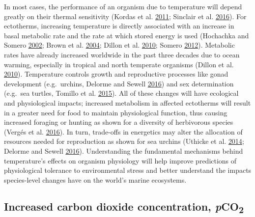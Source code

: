 \documentclass[a4paper,10pt, oneside]{memoir}
\begin{document}
In most cases, the performance of an organism due to temperature will depend greatly on their thermal sensitivity (Kordas et al. \protect\hyperlink{ref-Kordas2011}{2011}; Sinclair et al. \protect\hyperlink{ref-Sinclair2016}{2016}).
For ectotherms, increasing temperature is directly associated with an increase in basal metabolic rate and the rate at which stored energy is used (Hochachka and Somero \protect\hyperlink{ref-Hochachka2002}{2002}; Brown et al. \protect\hyperlink{ref-Brown2004}{2004}; Dillon et al. \protect\hyperlink{ref-Dillon2010}{2010}; Somero \protect\hyperlink{ref-Somero2012}{2012}).
Metabolic rates have already increased worldwide in the past three decades due to ocean warming, especially in tropical and north temperate organisms (Dillon et al. \protect\hyperlink{ref-Dillon2010}{2010}).
Temperature controls growth and reproductive processes like gonad development (e.g.~urchins, Delorme and Sewell \protect\hyperlink{ref-Delorme2016}{2016}) and sex determination (e.g.~sea turtles, Tomillo et al. \protect\hyperlink{ref-Tomillo2015}{2015}).
All of these changes will have ecological and physiological impacts; increased metabolism in affected ectotherms will result in a greater need for food to maintain physiological function, thus causing increased foraging or hunting as shown for a diversity of herbivorous species (Vergés et al. \protect\hyperlink{ref-Verges2016}{2016}). In turn, trade-offs in energetics may alter the allocation of resources needed for reproduction as shown for sea urchins (Uthicke et al. \protect\hyperlink{ref-Uthicke2014}{2014}; Delorme and Sewell \protect\hyperlink{ref-Delorme2016}{2016}).
Understanding the fundamental mechanisms behind temperature's effects on organism physiology will help improve predictions of physiological tolerance to environmental stress and better understand the impacts species-level changes have on the world's marine ecosystems.

\hypertarget{increased-carbon-dioxide-concentration-pco2}{%
\subsection{\texorpdfstring{Increased carbon dioxide concentration, \emph{p}CO\textsubscript{2}}{Increased carbon dioxide concentration, pCO2}}\label{increased-carbon-dioxide-concentration-pco2}}
\end{document}
